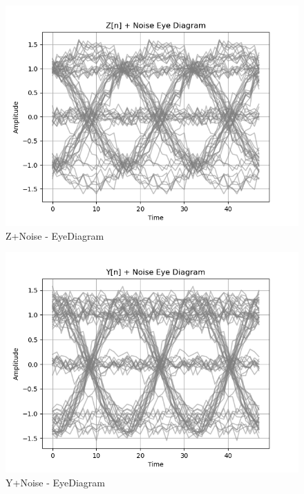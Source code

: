 \documentclass[
	letterpaper, %
	10pt, %
]{CSUniSchoolLabReport}
\begin{document}
\begin{figure}[H] %
	\centering %
	\includegraphics[width=1.2\textwidth]{assignment2a.png} %
	\caption{Z+Noise - EyeDiagram}
	\label{fig:block}
\end{figure}

\begin{figure}[H] %
	\centering %
	\includegraphics[width=1.2\textwidth]{assignment2b.png} %
	\caption{Y+Noise - EyeDiagram}
	\label{fig:block}
\end{figure}
\end{document}
